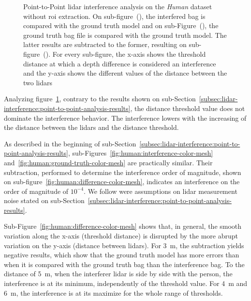 \begin{figure}[p]
	\caption[Point-to-Point analysis of the interference on the \textit{Human} dataset without \ac{roi} extraction. Results are presented for the ground-truth bag, interference bag and the subtraction of the results between the two.]{Point-to-Point \ac{lidar} interference analysis on the \textit{Human} dataset without \ac{roi} extraction. On sub-figure~(), the interfered bag is compared with the ground truth model and on sub-Figure~(), the ground truth bag file is compared with the ground truth model. The latter results are subtracted to the former, resulting on sub-figure~(). For every sub-figure, the x-axis shows the threshold distance at which a depth difference is considered an interference and the y-axis shows the different values of the distance between the two \acp{lidar}} 
	\label{fig:human:color-mesh}
\end{figure}

Analyzing figure~\ref{fig:human:color-mesh}, contrary to the results shown on sub-Section~\ref{subsec:lidar-interference:point-to-point-analysis-results}, the distance threshold value does not dominate the interference behavior. The interference lowers with the increasing of the distance between the \acp{lidar} and the distance threshold.

As described in the beginning of sub-Section~\ref{subsec:lidar-interference:point-to-point-analysis-results}, sub-Figures~\ref{fig:human:interference-color-mesh} and~\ref{fig:human:ground-truth-color-mesh} are practically similar. Their subtraction, performed to determine the interference order of magnitude, shown on sub-figure~\ref{fig:human:difference-color-mesh}, indicates an interference on the order of magnitude of $10^{-4}$. We follow were assumptions on \ac{lidar} measurement noise stated on sub-Section~\ref{subsec:lidar-interference:point-to-point-analysis-results}.

Sub-Figure~\ref{fig:human:difference-color-mesh} shows that, in general, the smooth variation along the x-axis (threshold distance) is disrupted by the more abrupt variation on the y-axis (distance between \acp{lidar}). For \SI{3}{\meter}, the subtraction yields negative results, which show that the ground truth model has more errors than when it is compared with the ground truth bag than the interference bag. To the distance of \SI{5}{\meter}, when the interferer \ac{lidar} is side by side with the person, the interference is at its minimum, independently of the threshold value. For \SI{4}{\meter} and \SI{6}{\meter}, the interference is at its maximize for the whole range of thresholds. 

